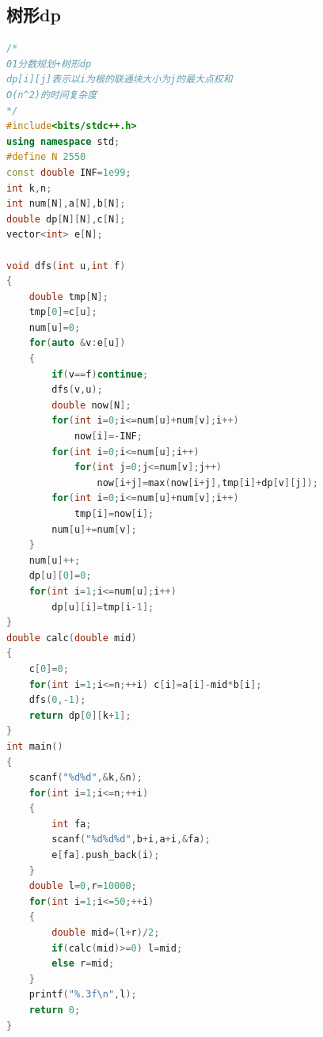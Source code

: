 \documentclass[UTF8,a4paper,titlepage]{ctexart}
\begin{document}
\subsection{树形dp}
\begin{lstlisting}[language=C++]
/*
01分数规划+树形dp
dp[i][j]表示以i为根的联通块大小为j的最大点权和
O(n^2)的时间复杂度
*/
#include<bits/stdc++.h>
using namespace std;
#define N 2550
const double INF=1e99;
int k,n;
int num[N],a[N],b[N];
double dp[N][N],c[N];
vector<int> e[N];

void dfs(int u,int f)
{
    double tmp[N];
    tmp[0]=c[u];
    num[u]=0;
    for(auto &v:e[u])
    {
        if(v==f)continue;
        dfs(v,u);
        double now[N];
        for(int i=0;i<=num[u]+num[v];i++)
            now[i]=-INF;
        for(int i=0;i<=num[u];i++)
            for(int j=0;j<=num[v];j++)
                now[i+j]=max(now[i+j],tmp[i]+dp[v][j]);
        for(int i=0;i<=num[u]+num[v];i++)
            tmp[i]=now[i];
        num[u]+=num[v];
    }
    num[u]++;
    dp[u][0]=0;
    for(int i=1;i<=num[u];i++)
        dp[u][i]=tmp[i-1];
}
double calc(double mid)
{
    c[0]=0;
    for(int i=1;i<=n;++i) c[i]=a[i]-mid*b[i];
    dfs(0,-1);
    return dp[0][k+1];
}
int main()
{
    scanf("%d%d",&k,&n);
    for(int i=1;i<=n;++i)
    {
        int fa;
        scanf("%d%d%d",b+i,a+i,&fa);
        e[fa].push_back(i);
    }
    double l=0,r=10000;
    for(int i=1;i<=50;++i)
    {
        double mid=(l+r)/2;
        if(calc(mid)>=0) l=mid;
        else r=mid;
    }
    printf("%.3f\n",l);
    return 0;
}
      \end{lstlisting}
\end{document}
